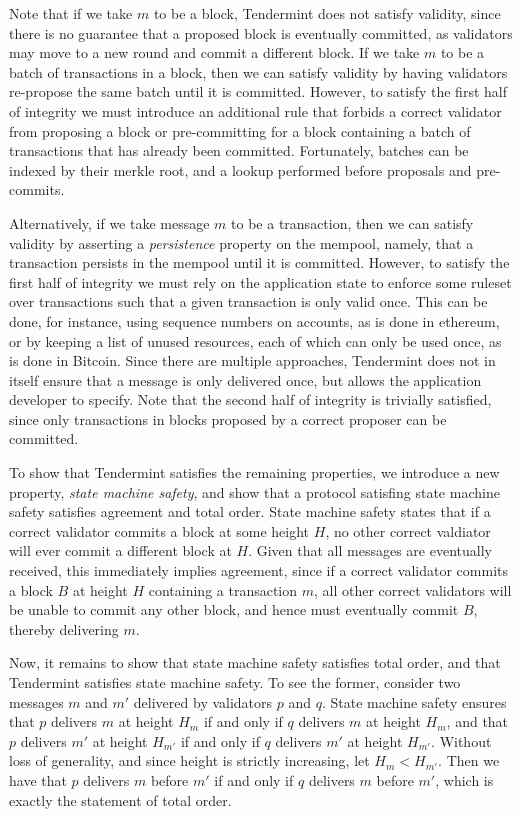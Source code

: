 Note that if we take $m$ to be a block,
Tendermint does not satisfy validity,
since there is no guarantee that a proposed block is eventually committed, 
as validators may move to a new round and commit a different block.
If we take $m$ to be a batch of transactions in a block, 
then we can satisfy validity by having validators re-propose the same batch until it is committed.
However, to satisfy the first half of integrity 
we must introduce an additional rule that forbids a correct validator from 
proposing a block or pre-committing for a block containing a 
batch of transactions that has already been committed.
Fortunately, batches can be indexed by their merkle root,
and a lookup performed before proposals and pre-commits.

Alternatively, if we take message $m$ to be a transaction, 
then we can satisfy validity by asserting a \emph{persistence}
property on the mempool, namely, that a transaction persists in the mempool 
until it is committed.
However, to satisfy the first half of integrity we must 
rely on the application state to enforce some ruleset over 
transactions such that a given transaction is only valid once. 
This can be done, for instance, using sequence numbers on accounts,
as is done in ethereum, 
or by keeping a list of unused resources, each of which can only be used once,
as is done in Bitcoin.
Since there are multiple approaches,
Tendermint does not in itself ensure that a message is only delivered once,
but allows the application developer to specify.
Note that the second half of integrity is trivially satisfied,
since only transactions in blocks proposed by a correct proposer can be committed.

To show that Tendermint satisfies the remaining properties,
we introduce a new property, \emph{state machine safety},
and show that a protocol satisfing state machine safety satisfies
agreement and total order.
State machine safety states that if a correct validator commits a block at some height $H$,
no other correct valdiator will ever commit a different block at $H$.
Given that all messages are eventually received, 
this immediately implies agreement, since if a correct validator commits a block $B$ at height $H$ 
containing a transaction $m$, all other correct validators will be unable to commit any other block,
and hence must eventually commit $B$, thereby delivering $m$.

Now, it remains to show that state machine safety satisfies total order,
and that Tendermint satisfies state machine safety.
To see the former, consider two messages $m$ and $m'$ delivered by validators $p$ and $q$.
State machine safety ensures that $p$ delivers $m$ at height $H_m$ if and only if
$q$ delivers $m$ at height $H_m$, and that $p$ delivers $m'$ at height $H_{m'}$ 
if and only if $q$ delivers $m'$ at height $H_{m'}$. 
Without loss of generality, and since height is strictly increasing, let $H_m < H_{m'}$.
Then we have that $p$ delivers $m$ before $m'$ if and only if $q$ delivers $m$ before $m'$,
which is exactly the statement of total order.

